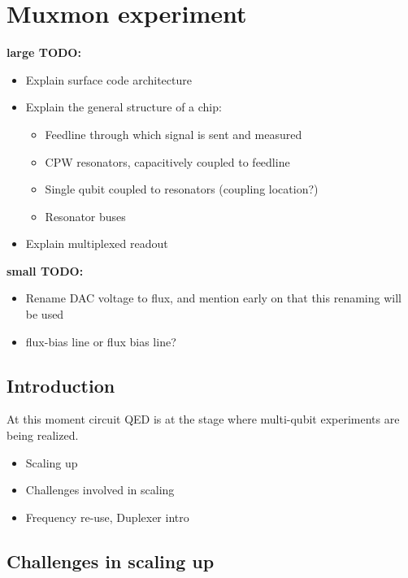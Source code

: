 

\part{Muxmon experiment}

  \textbf{large TODO:}
  \begin{itemize}
    \item Explain surface code architecture
    \item Explain the general structure of a chip:
    \begin{itemize}
      \item Feedline through which signal is sent and measured
      \item CPW resonators, capacitively coupled to feedline
      \item Single qubit coupled to resonators (coupling location?)
      \item Resonator buses
    \end{itemize}
    \item Explain multiplexed readout
  \end{itemize}

  \textbf{small TODO:}
  \begin{itemize}
    \item Rename DAC voltage to flux, and mention early on that this renaming will be used
    \item flux-bias line or flux bias line?
  \end{itemize}



  \chapter*{Introduction}

    At this moment circuit QED is at the stage where multi-qubit experiments are being realized.

    \begin{itemize}
        \item Scaling up
        \item Challenges involved in scaling
        \item Frequency re-use, Duplexer intro
    \end{itemize}


  \chapter{Challenges in scaling up}
    \label{ch:Muxmon chip architecture}

